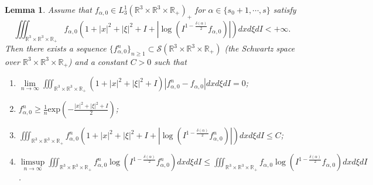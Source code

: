 \documentclass[10pt,a4paper]{amsart}
\newtheorem{lemma}{Lemma}
\def\R{\mathbb{R}}
\def\exp{\mathrm{exp}}
\begin{document}
\begin{lemma}\label{Lemma 4.9}
	Assume that $f_{\alpha,0 } \in L^1_3( \R^3 \times \R^3 \times \R_+)_+ $ for $\alpha \in \{s_0+1,\cdots ,s\}$ satisfy
	\begin{equation}\label{eq 4.51}
		\iiint_{\R^3 \times \R^3 \times \R_+ } f_{\alpha,0 } (1+|x|^2 +|\xi|^2+I + |\log (I ^{1-\frac{\delta(\alpha )}{2} } f_{\alpha,0 } )|)  dxd\xi dI<+ \infty .
	\end{equation}
	Then there exists a sequence $\{f^n_{\alpha,0 }\}_{n\geq 1} \subset \mathscr{S} (\R^3 \times \R^3 \times \R_+ ) $ (the Schwartz space over $\R^3 \times \R^3 \times \R_+$) and a constant $C > 0$ such that 
	\begin{enumerate}
		\item {$\lim \limits_{n\rightarrow \infty}  \iiint_{\R^3 \times \R^3 \times \R_+ } (1+|x|^2 +|\xi|^2+I) |f^n_{\alpha,0 } - f_{\alpha,0 }| dxd\xi dI=0 $;}\label{1 of Lemma 4.9}
		\item {$f^n_{\alpha,0 } \geq \frac{1}{n} \exp (- \frac{|x|^2+ |\xi|^2 + I }{2})$; }\label{2 of Lemma 4.9}
		\item {$\iiint_{\R^3 \times \R^3 \times \R_+ } f^n_{\alpha,0 } (1+|x|^2 +|\xi|^2 + I + |\log (I ^{1-\frac{\delta(\alpha )}{2} }f^n_{\alpha,0 })|)dxd\xi dI \leq C $;}\label{3 of Lemma 4.9}
		\item {\small $\limsup \limits_{n\rightarrow \infty} \iiint_{\R^3 \times \R^3 \times \R_+ } f^n_{\alpha,0 } \log (I ^{1-\frac{\delta(\alpha )}{2} } f^n_{\alpha,0 } ) dxd\xi dI
			\leq \iiint_{\R^3 \times \R^3 \times \R_+ } f_{\alpha,0 } \log (I ^{1-\frac{\delta(\alpha )}{2} } f_{\alpha,0 } ) dxd\xi dI$.}\label{4 of Lemma 4.9}
	\end{enumerate}
\end{lemma}
\end{document}
